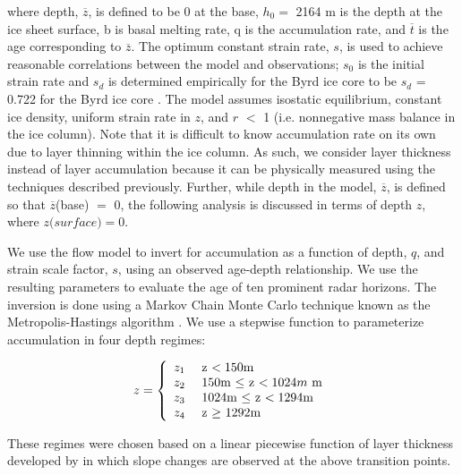 \documentclass[12pt]{article}
\begin{document}
where depth, $\overline{z}$, is defined to be 0 at the base, $h_0 =$ 2164 m is the depth at the ice sheet surface, b is basal melting rate, q is the accumulation rate, and $\overline{t}$ is the age corresponding to $\overline{z}$. The optimum constant strain rate, $\textit{s}$, is used to achieve reasonable correlations between the model and observations; $s_0$ is the initial strain rate and $s_d$ is determined empirically for the Byrd ice core to be $s_d$ = 0.722 for the Byrd ice core \citep{morland09}. The model assumes isostatic equilibrium, constant ice density, uniform strain rate in $\textit{z}$, and $\textit{r}$ $<$ 1 (i.e. nonnegative mass balance in the ice column). Note that it is difficult to know accumulation rate on its own due to layer thinning within the ice column. As such, we consider layer thickness instead of layer accumulation because it can be physically measured using the techniques described previously. Further, while depth in the model, $\overline{z}$, is defined so that $\overline{z}$(base) $=$ 0, the following analysis is discussed in terms of depth $\textit{z}$, where $\textit{z(surface)} = 0$.

We use the flow model to invert for accumulation as a function of depth, $\textit{q}$, and strain scale factor, $\textit{s}$, using an observed age-depth relationship. We use the resulting parameters to evaluate the age of ten prominent radar horizons. The inversion is done using a Markov Chain Monte Carlo technique known as the Metropolis-Hastings algorithm \cite{metropolis53}. We use a stepwise function to parameterize accumulation in four depth regimes:

$$
z = \left\{ \begin{array}{rl}
z_1 & \mbox{  z $< 150$m } \\
z_2 & \mbox{  150m $\le$ z $< 1024 m$ m} \\
z_3 & \mbox{  1024m $\le$ z $ < 1294$m} \\
z_4 & \mbox{  z $\ge$ 1292m }\end{array} \right.
\\
$$

These regimes were chosen based on a linear piecewise function of layer thickness developed by \citet{hammer1994} in which slope changes are observed at the above transition points. %

\end{document}
